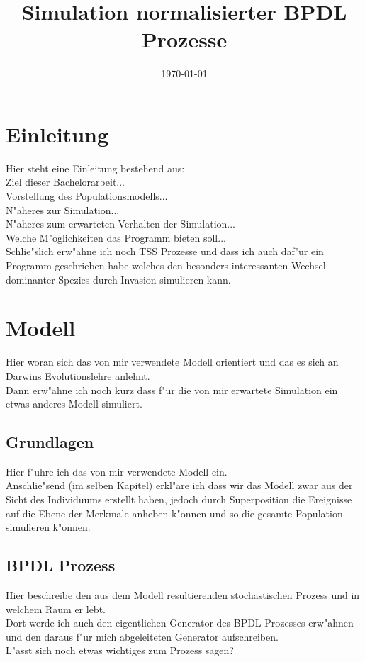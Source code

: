 \documentclass[11pt, a4paper, german]{article}
\date{\today}
\title{Simulation normalisierter BPDL Prozesse}
\begin{document}
\maketitle
\tableofcontents

\clearpage


\section{Einleitung}
Hier steht eine Einleitung bestehend aus:\\
Ziel dieser Bachelorarbeit...\\
Vorstellung des Populationsmodells...\\
N"aheres zur Simulation... \\
N"aheres zum erwarteten Verhalten der Simulation...\\
Welche M"oglichkeiten das Programm bieten soll...\\
Schlie"slich erw"ahne ich noch TSS Prozesse und dass ich auch daf"ur ein Programm geschrieben habe welches den besonders interessanten Wechsel dominanter Spezies durch Invasion simulieren kann.


\clearpage
\section{Modell}
Hier woran sich das von mir verwendete Modell orientiert \cite{Champagnat20061127} und das es sich an Darwins Evolutionslehre anlehnt.\\
Dann erw"ahne ich noch kurz dass f"ur die von mir erwartete Simulation ein etwas anderes Modell simuliert.

	\subsection{Grundlagen}
	Hier f"uhre ich das von mir verwendete Modell ein.\\
	Anschlie"send (im selben Kapitel) erkl"are ich dass wir das Modell zwar aus der Sicht des Individuums erstellt haben, jedoch durch Superposition die Ereignisse auf die Ebene der Merkmale anheben k"onnen und so die gesamte Population simulieren k"onnen.
	
	\subsection{BPDL Prozess}
	Hier beschreibe den aus dem Modell resultierenden stochastischen Prozess und in welchem Raum er lebt. \\
	Dort werde ich auch den eigentlichen Generator des BPDL Prozesses erw"ahnen und den daraus f"ur mich abgeleiteten Generator aufschreiben.\\
	L"asst sich noch etwas wichtiges zum Prozess sagen?
	
\end{document}
